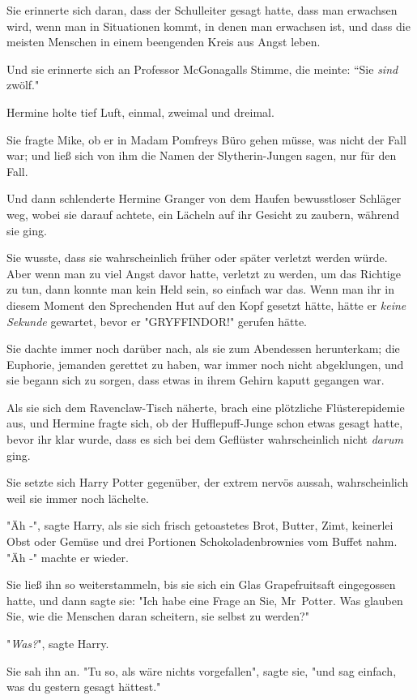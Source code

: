 {Sie erinnerte sich daran, dass der Schulleiter gesagt hatte, dass man erwachsen wird, wenn man in Situationen kommt, in denen man erwachsen ist, und dass die meisten Menschen in einem beengenden Kreis aus Angst leben.

Und sie erinnerte sich an Professor McGonagalls Stimme, die meinte: “Sie \emph{sind} zwölf."

Hermine holte tief Luft, einmal, zweimal und dreimal.

Sie fragte Mike, ob er in Madam Pomfreys Büro gehen müsse, was nicht der Fall war; und ließ sich von ihm die Namen der Slytherin-Jungen sagen, nur für den Fall.

Und dann schlenderte Hermine Granger von dem Haufen bewusstloser Schläger weg, wobei sie darauf achtete, ein Lächeln auf ihr Gesicht zu zaubern, während sie ging.

Sie wusste, dass sie wahrscheinlich früher oder später verletzt werden würde. Aber wenn man zu viel Angst davor hatte, verletzt zu werden, um das Richtige zu tun, dann konnte man kein Held sein, so einfach war das. Wenn man ihr in diesem Moment den Sprechenden Hut auf den Kopf gesetzt hätte, hätte er \emph{keine Sekunde} gewartet, bevor er "GRYFFINDOR!" gerufen hätte.

Sie dachte immer noch darüber nach, als sie zum Abendessen herunterkam; die Euphorie, jemanden gerettet zu haben, war immer noch nicht abgeklungen, und sie begann sich zu sorgen, dass etwas in ihrem Gehirn kaputt gegangen war.

Als sie sich dem Ravenclaw-Tisch näherte, brach eine plötzliche Flüsterepidemie aus, und Hermine fragte sich, ob der Hufflepuff-Junge schon etwas gesagt hatte, bevor ihr klar wurde, dass es sich bei dem Geflüster wahrscheinlich nicht \emph{darum} ging.

Sie setzte sich Harry Potter gegenüber, der extrem nervös aussah, wahrscheinlich weil sie immer noch lächelte.

"Äh -", sagte Harry, als sie sich frisch getoastetes Brot, Butter, Zimt, keinerlei Obst oder Gemüse und drei Portionen Schokoladenbrownies vom Buffet nahm. "Äh -" machte er wieder.

Sie ließ ihn so weiterstammeln, bis sie sich ein Glas Grapefruitsaft eingegossen hatte, und dann sagte sie: "Ich habe eine Frage an Sie, Mr~Potter. Was glauben Sie, wie die Menschen daran scheitern, sie selbst zu werden?"

"\emph{Was?}", sagte Harry.

Sie sah ihn an. "Tu so, als wäre nichts vorgefallen", sagte sie, "und sag einfach, was du gestern gesagt hättest."

}

